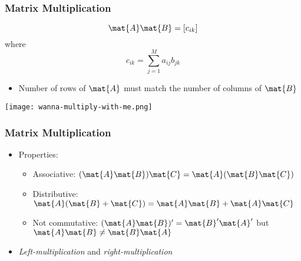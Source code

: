 \documentclass[mathserif, xcolor=table, svgnames]{beamer}
\begin{document}
\begin{frame}
  \frametitle{Matrix Multiplication}
  \begin{equation*}
    \mat{A} \mat{B} = [ c_{ik} ]
  \end{equation*}
  where
  \begin{equation*}
    c_{ik} = \sum_{j = 1}^{M} a_{ij} b_{jk}
  \end{equation*}
  \begin{itemize}
  \item Number of rows of $\mat{A}$ must match the number of columns
    of $\mat{B}$
  \end{itemize}
  \texttt{[image: wanna-multiply-with-me.png]}
\end{frame}


\begin{frame}
  \frametitle{Matrix Multiplication}
  \begin{itemize}
  \item Properties:
    \begin{itemize}
    \item Associative: $(\mat{A}\mat{B})\mat{C} = \mat{A}(\mat{B}\mat{C})$
    \item Distributive: $\mat{A}(\mat{B}+\mat{C}) = \mat{A}\mat{B} + \mat{A}\mat{C}$
    \item Not commutative: $(\mat{A}\mat{B})' = \mat{B}' \mat{A}'$ but
      $\mat{A}\mat{B} \not= \mat{B}\mat{A}$
    \end{itemize}
  \item \emph{Left-multiplication} and \emph{right-multiplication}
  \end{itemize}
\end{frame}
\end{document}
